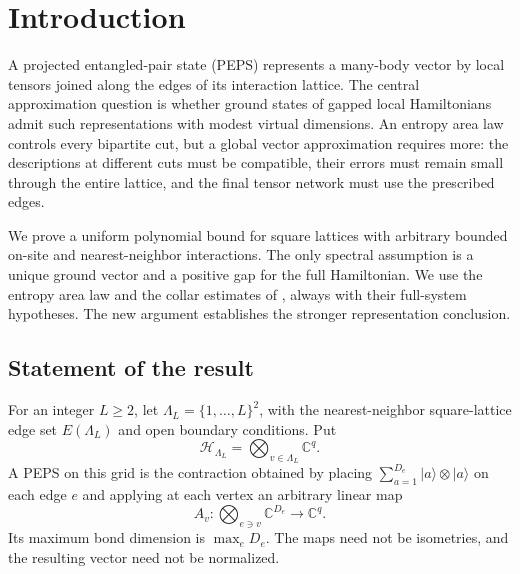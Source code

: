 \section{Introduction}\label{sec:introduction}

A projected entangled-pair state (PEPS) represents a many-body vector by local
tensors joined along the edges of its interaction lattice. The central
approximation question is whether ground states of gapped local Hamiltonians
admit such representations with modest virtual dimensions. An entropy area
law controls every bipartite cut, but a global vector approximation requires
more: the descriptions at different cuts must be compatible, their errors
must remain small through the entire lattice, and the final tensor network
must use the prescribed edges.

We prove a uniform polynomial bound for square lattices with arbitrary
bounded on-site and nearest-neighbor interactions. The only spectral
assumption is a unique ground vector and a positive gap for the full
Hamiltonian. We use the entropy area law and the collar estimates of
\cite{RepoAreaLaw}, always with their full-system hypotheses. The new argument
establishes the stronger representation conclusion.

\subsection{Statement of the result}

For an integer $L\ge2$, let $\Lambda_L=\{1,\ldots,L\}^2$, with the
nearest-neighbor square-lattice edge set $E(\Lambda_L)$ and open boundary
conditions. Put
\[
 \mathcal H_{\Lambda_L}=\bigotimes_{v\in\Lambda_L}\mathbb C^q.
\]
A PEPS on this grid is the contraction obtained by placing
$\sum_{a=1}^{D_e}|a\rangle\otimes|a\rangle$ on each edge $e$ and applying
at each vertex an arbitrary linear map
\[
 A_v:\bigotimes_{e\ni v}\mathbb C^{D_e}\longrightarrow\mathbb C^q.
\]
Its maximum bond dimension is $\max_eD_e$. The maps need not be isometries,
and the resulting vector need not be normalized.

